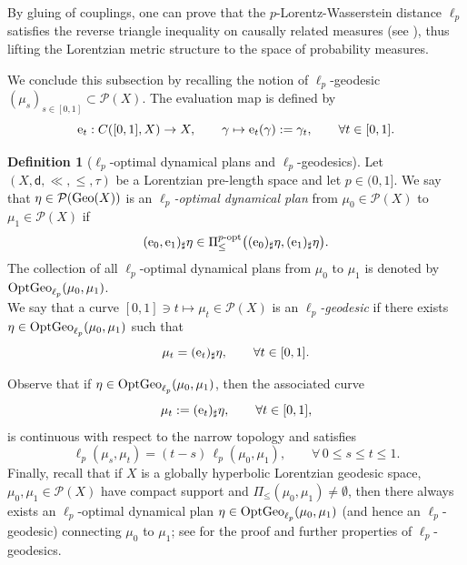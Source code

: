 \documentclass[a4paper,10pt]{article}
\newcommand{\Geo}{{\rm Geo}}
\newcommand{\Prob}{\mathcal P}
\newcommand{\ee}{{\rm e}}
\newcommand{\sfd}{\mathsf d}
\theoremstyle{plain}
\theoremstyle{definition}
\newtheorem{definition}[lemma]{Definition}
\numberwithin{equation}{section}
\begin{document}
By gluing of couplings, one can prove that the $p$-Lorentz-Wasserstein distance $\ell_p$ satisfies the reverse triangle inequality on causally related measures (see \cite[Proposition 2.5]{CaMo:20}), thus lifting the Lorentzian metric structure to the space of probability measures.


 
We conclude this subsection by recalling the notion of $\ell_p$-geodesic $(\mu_s)_{s\in [0,1]}\subset \mathcal{P}(X)$.  The evaluation map is defined by
\begin{equation}\label{def:eet}
\ee_{t}: C([0,1], X) \to X, 
\qquad 
\gamma \mapsto \ee_{t}(\gamma):=\gamma_{t}, 
\qquad \forall t\in [0,1].
\end{equation}


\begin{definition}[$\ell_p$-optimal dynamical plans and $\ell_p$-geodesics]\label{def:ellp-DOP}
Let $(X,\sfd, \ll, \leq, \tau)$ be a Lorentzian pre-length space and let $p\in (0,1]$.  
We say that $\eta\in \mathcal{P}(\Geo(X))$ is an \emph{$\ell_p$-optimal dynamical plan} from $\mu_0\in \mathcal{P}(X)$ to $\mu_1\in \mathcal{P}(X)$ if 
\begin{equation}\label{eq:defODP}
(\ee_0, \ee_1)_{\sharp} \eta 
\in 
\Pi^{p\text{-opt}}_{\leq} \big((\ee_0)_\sharp \eta, (\ee_1)_\sharp \eta\big).
\end{equation}
%
The collection of all $\ell_p$-optimal dynamical plans from $\mu_{0}$ to $\mu_{1}$ is denoted by ${\rm OptGeo}_{\ell_{p}}(\mu_{0}, \mu_{1})$.
%
\\ We say that a curve $[0,1]\ni t \mapsto \mu_{t}\in \mathcal{P}(X)$ is an \emph{$\ell_p$-geodesic} if there exists $\eta\in {\rm OptGeo}_{\ell_p}(\mu_0,\mu_1)$ such that
\[
\mu_t=(\ee_t)_\sharp \eta,
\qquad \forall t\in [0,1].
\]
\end{definition}
%
Observe that if $\eta\in {\rm OptGeo}_{\ell_p}(\mu_0,\mu_1)$, then the associated curve
\[
\mu_t:=(\ee_t)_\sharp \eta, 
\qquad \forall t\in [0,1],
\]
is continuous with respect to the narrow topology and satisfies
\[
\ell_p(\mu_s,\mu_t)
=
(t-s)\,\ell_p(\mu_0,\mu_1),
\qquad 
\forall\, 0\le s\le t\le 1.
\]
%
Finally, recall that if $X$ is a globally hyperbolic Lorentzian geodesic space, $\mu_0,\mu_1\in \Prob(X)$ have compact support and  $\Pi_{\leq}(\mu_0, \mu_1)\neq \emptyset$, then there always exists an $\ell_p$-optimal dynamical plan $\eta\in {\rm OptGeo}_{\ell_p}(\mu_0,\mu_1)$ (and hence an $\ell_p$-geodesic) connecting $\mu_0$ to $\mu_1$; see \cite[Proposition 2.33]{CaMo:20} for the proof and further properties of $\ell_p$-geodesics.
\end{document}
